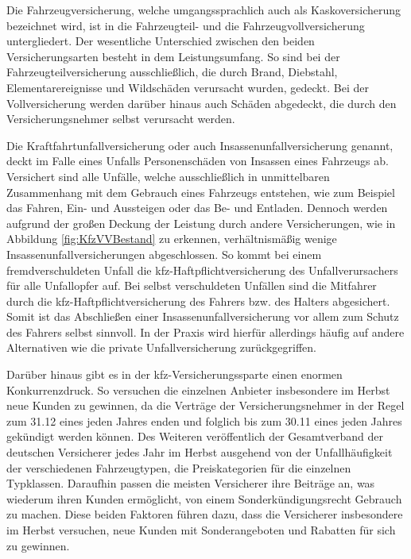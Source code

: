 Die Fahrzeugversicherung, welche umgangssprachlich auch als Kaskoversicherung bezeichnet wird, ist in die Fahrzeugteil- und die Fahrzeugvollversicherung untergliedert. Der wesentliche Unterschied zwischen den beiden Versicherungsarten besteht in dem Leistungsumfang. So sind bei der Fahrzeugteilversicherung ausschließlich, die durch Brand, Diebstahl, Elementarereignisse und Wildschäden verursacht wurden, gedeckt. Bei der Vollversicherung werden darüber hinaus auch Schäden abgedeckt, die durch den Versicherungsnehmer selbst verursacht werden.\autocite[Vgl.][S. 48]{FELTEN2012}

Die Kraftfahrtunfallversicherung oder auch Insassenunfallversicherung genannt, deckt im Falle eines Unfalls Personenschäden von Insassen eines Fahrzeugs ab. Versichert sind alle Unfälle, welche ausschließlich in unmittelbaren Zusammenhang mit dem Gebrauch eines Fahrzeugs entstehen, wie zum Beispiel das Fahren, Ein- und Aussteigen oder das Be- und Entladen.\autocite[Vgl.][S. 6f]{STADLER1998} Dennoch werden aufgrund der großen Deckung der Leistung durch andere Versicherungen, wie in Abbildung \vref{fig:KfzVVBestand} zu erkennen, verhältnismäßig wenige Insassenunfallversicherungen abgeschlossen. So kommt bei einem fremdverschuldeten Unfall die \ac{kfz}-Haftpflichtversicherung des Unfallverursachers für alle Unfallopfer auf. Bei selbst verschuldeten Unfällen sind die Mitfahrer durch die \ac{kfz}-Haftpflichtversicherung des Fahrers bzw. des Halters abgesichert. Somit ist das Abschließen einer Insassenunfallversicherung vor allem zum Schutz des Fahrers selbst sinnvoll.\autocite[Vgl.][S. 173f]{LAMMERS2006} In der Praxis wird hierfür allerdings häufig auf andere Alternativen wie die private Unfallversicherung zurückgegriffen.\autocite[Vgl.][]{GRATZLA2018}  

Darüber hinaus gibt es in der \ac{kfz}-Versicherungssparte einen enormen Konkurrenzdruck. So versuchen die einzelnen Anbieter insbesondere im Herbst neue Kunden zu gewinnen, da die Verträge der Versicherungsnehmer in der Regel zum 31.12 eines jeden Jahres enden und folglich bis zum 30.11 eines jeden Jahres gekündigt werden können.\autocite[Vgl.][]{WARENTEST2022} Des Weiteren veröffentlich der Gesamtverband der deutschen Versicherer jedes Jahr im Herbst ausgehend von der Unfallhäufigkeit der verschiedenen Fahrzeugtypen, die Preiskategorien für die einzelnen Typklassen. Daraufhin passen die meisten Versicherer ihre Beiträge an, was wiederum ihren Kunden ermöglicht, von einem Sonderkündigungsrecht Gebrauch zu machen.\autocite[Vgl.][]{NUS2022} Diese beiden Faktoren führen dazu, dass die Versicherer insbesondere im Herbst versuchen, neue Kunden mit Sonderangeboten und Rabatten für sich zu gewinnen. 

